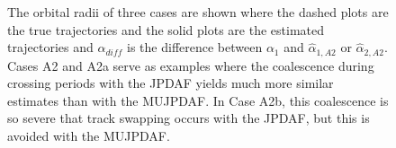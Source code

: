 \documentclass[letterpaper, paper,10pt]{AAS}		%
\begin{document}
\begin{figure}
{
\centerline{
	}
\centerline{
	}
\centerline{
	}
}
\caption{The orbital radii of three cases are shown where the dashed plots are the true trajectories and the solid plots are the estimated trajectories and $\alpha_{diff}$ is the difference between $\alpha_{1}$ and $\hat\alpha_{1,A2}$ or $\hat\alpha_{2,A2}$.
Cases A2 and A2a serve as examples where the coalescence during crossing periods with the JPDAF yields much more similar estimates than with the MUJPDAF.
In Case A2b, this coalescence is so severe that track swapping occurs with the JPDAF, but this is avoided with the MUJPDAF.
}\label{fig:A2}
\end{figure}
\end{document}
